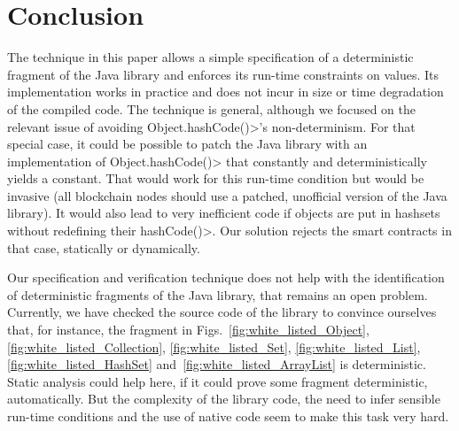 \section{Conclusion}\label{sec:conclusion}

The technique in this paper allows a simple
specification of a deterministic fragment of the Java library and
enforces its run-time constraints on values.
Its implementation works in practice and does not incur
in size or time degradation of the compiled code.
The technique is general, although we focused on the
relevant issue of avoiding \<Object.hashCode()>'s non-determinism.
For that special case, it could be possible to patch the Java library
with an implementation of \<Object.hashCode()> that constantly and
deterministically yields a constant. That would work for this run-time condition
but would be invasive (all blockchain nodes should use a patched,
unofficial version of the Java library). It would also lead to very inefficient
code if objects are put in hashsets without redefining their \<hashCode()>.
Our solution rejects the smart contracts in that case, statically or dynamically.

Our specification and verification technique does not help with the
identification of deterministic fragments of the Java library, that remains
an open problem. Currently,
we have checked the source code of the library to convince ourselves that,
for instance, the fragment in Figs.~\ref{fig:white_listed_Object}, \ref{fig:white_listed_Collection},
\ref{fig:white_listed_Set}, \ref{fig:white_listed_List},
\ref{fig:white_listed_HashSet} and~\ref{fig:white_listed_ArrayList} is deterministic.
Static analysis could help here, if it could prove some fragment deterministic,
automatically. But the complexity of the library code, the need to infer
sensible run-time conditions and the use of native code seem to make this task very hard.

